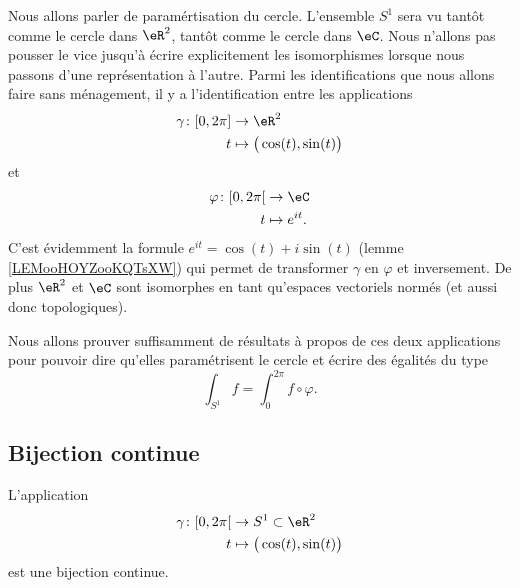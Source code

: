 Nous allons parler de paramértisation du cercle. L'ensemble \( S^1\) sera vu tantôt comme le cercle dans \( \eR^2\), tantôt comme le cercle dans \( \eC\). Nous n'allons pas pousser le vice jusqu'à écrire explicitement les isomorphismes lorsque nous passons d'une représentation à l'autre. Parmi les identifications que nous allons faire sans ménagement, il y a l'identification entre les applications
\begin{equation}
	\begin{aligned}
		\gamma\colon \mathopen[ 0 , 2\pi \mathclose] & \to \eR^2                           \\
		t                                            & \mapsto \big( \cos(t),\sin(t) \big)
	\end{aligned}
\end{equation}
et
\begin{equation}
	\begin{aligned}
		\varphi\colon \mathopen[ 0 , 2\pi \mathclose[ & \to \eC          \\
		t                                             & \mapsto  e^{it}.
	\end{aligned}
\end{equation}
C'est évidemment la formule \(  e^{it}=\cos(t)+i\sin(t)\) (lemme \ref{LEMooHOYZooKQTsXW}) qui permet de transformer \( \gamma\) en \( \varphi\) et inversement. De plus \( \eR^2\) et \( \eC\) sont isomorphes en tant qu'espaces vectoriels normés (et aussi donc topologiques).


Nous allons prouver suffisamment de résultats à propos de ces deux applications pour pouvoir dire qu'elles paramétrisent le cercle et écrire des égalités du type
\begin{equation}
	\int_{S^1}f=\int_{0}^{2\pi}f\circ\varphi.
\end{equation}

\subsection{Bijection continue}

\begin{proposition}     \label{PROPooKSGXooOqGyZj}
	L'application
	\begin{equation}
		\begin{aligned}
			\gamma\colon \mathopen[ 0 , 2\pi \mathclose[ & \to S^1\subset \eR^2                \\
			t                                            & \mapsto \big( \cos(t),\sin(t) \big)
		\end{aligned}
	\end{equation}
	est une bijection continue.
\end{proposition}

